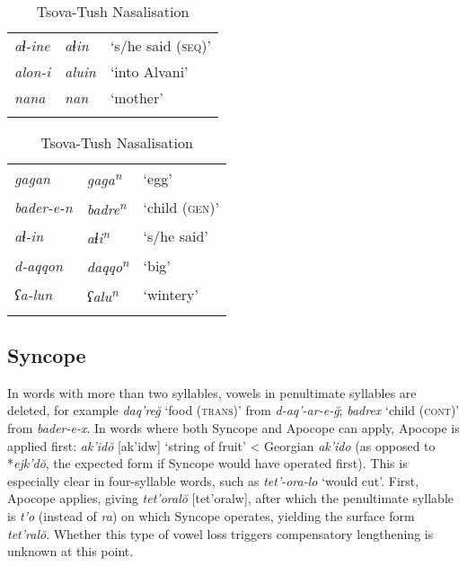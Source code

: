 \begin{table}
	\begin{subtable}[t]{.5\textwidth}
	\centering
	\caption{}
	\begin{tabular}{lll}
		\lsptoprule
		\textit{aɬ-ine} & \textit{aɬin} & `s/he said (\textsc{seq})' \\
		\textit{alon-i} & \textit{aluin} & `into Alvani' \\
		\textit{nana} & \textit{nan} & `mother' \\
		\lspbottomrule
	\end{tabular}
	\end{subtable}%
	\begin{subtable}[t]{.5\textwidth}
	\centering
	\caption{}
	\begin{tabular}{lll}
		\lsptoprule
		\textit{gagan} & \textit{gaga\textsuperscript{n}} & `egg' \\
		\textit{bader-e-n} & \textit{badre\textsuperscript{n}} & `child (\textsc{gen})' \\
		\textit{aɬ-in} & \textit{aɬi\textsuperscript{n}} & `s/he said' \\
		\textit{d-aqqon} & \textit{daqqo\textsuperscript{n}} & `big' \\
		\textit{ʕa-lun} & \textit{ʕalu\textsuperscript{n}} & `wintery' \\
		\lspbottomrule
	\end{tabular}
	\end{subtable}
	\caption{Tsova-Tush Nasalisation}
	\label{table-nasal3}
\end{table}


\subsection{Syncope}

In words with more than two syllables, vowels in penultimate syllables are deleted, for example \textit{daq're\u{g}} `food (\textsc{trans})' from \textit{d-aq'-ar-e-\u{g}}; \textit{badrex} `child (\textsc{cont})' from \textit{bader-e-x}.
In words where both Syncope and Apocope can apply, Apocope is applied first: \textit{ak'id\u{o}} [ak'idw] `string of fruit' < Georgian \textit{ak'ido} (as opposed to *\textit{ejk'd\u{o}}, the expected form if Syncope would have operated first). This is especially clear in four-syllable words, such as \textit{tet'-ora-lo} `would cut'. First, Apocope applies, giving \textit{tet'oral\u{o}} [tet'oralw], after which the penultimate syllable is \textit{t'o} (instead of \textit{ra}) on which Syncope operates, yielding the surface form \textit{tet'ral\u{o}}.
Whether this type of vowel loss triggers compensatory lengthening is unknown at this point.


